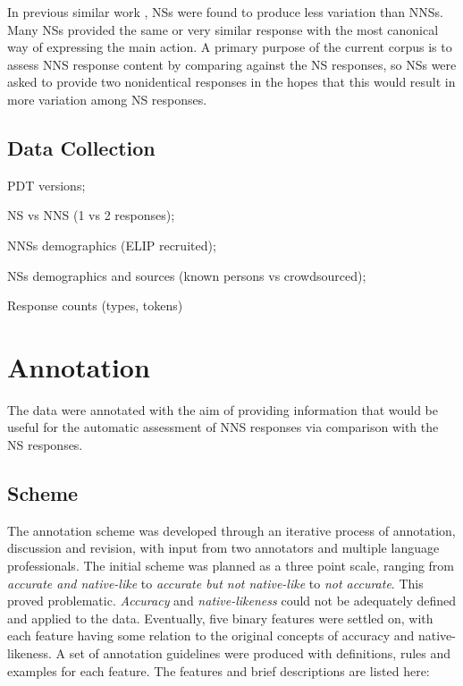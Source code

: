 \documentclass[11pt,a4paper]{article}
\begin{document}
In previous similar work \citep{king:dickinson:13,king:dickinson:16}, NSs were found to produce less variation than NNSs. Many NSs provided the same or very similar response with the most canonical way of expressing the main action. A primary purpose of the current corpus is to assess NNS response content by comparing against the NS responses, so NSs were asked to provide two nonidentical responses in the hopes that this would result in more variation among NS responses.

\subsection{Data Collection}
PDT versions;

NS vs NNS (1 vs 2 responses); 

NNSs demographics (ELIP recruited); 

NSs demographics and sources (known persons vs crowdsourced);

Response counts (types, tokens)

\section{Annotation}
The data were annotated with the aim of providing information that would be useful for the automatic assessment of NNS responses via comparison with the NS responses.

\subsection{Scheme}
The annotation scheme was developed through an iterative process of annotation, discussion and revision, with input from two annotators and multiple language professionals. The initial scheme was planned as a three point scale, ranging from \textit{accurate and native-like} to \textit{accurate but not native-like} to \textit{not accurate}. This proved problematic. \textit{Accuracy} and \textit{native-likeness} could not be adequately defined and applied to the data. Eventually, five binary features were settled on, with each feature having some relation to the original concepts of accuracy and native-likeness. A set of annotation guidelines were produced with definitions, rules and examples for each feature. The features and brief descriptions are listed here:
\end{document}
